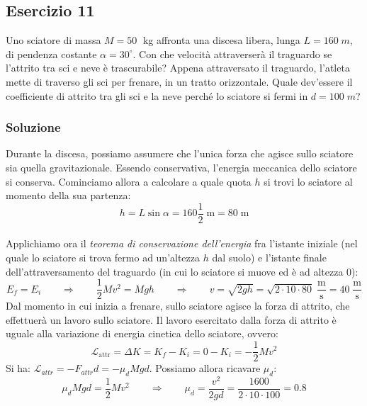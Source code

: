\documentclass[12pt,a4paper]{book}
\begin{document}
\subsection*{Esercizio 11}
Uno sciatore di massa $M=50 \;$ kg affronta una discesa libera, lunga $L=160 \; m$, di pendenza costante $\alpha=30^{\circ}$. Con che velocità attraverserà il traguardo se l'attrito tra sci e neve è trascurabile? Appena attraversato il traguardo, l'atleta mette di traverso gli sci per frenare, in un tratto orizzontale. Quale dev'essere il coefficiente di attrito tra gli sci e la neve perché lo sciatore si fermi in $d=100 \; m$? 

\subsubsection*{Soluzione}
Durante la discesa, possiamo assumere che l'unica forza che agisce sullo sciatore sia quella gravitazionale. Essendo conservativa, l'energia meccanica dello sciatore si conserva. Cominciamo allora a calcolare a quale quota $h$ si trovi lo sciatore al momento della sua partenza:\\
\begin{equation*}
h=L \sin\alpha = 160 \frac{1}{2} \; \text{m} = 80 \; \text{m}
\end{equation*}\\

Applichiamo ora il \textit{teorema di conservazione dell'energia} fra l'istante iniziale (nel quale lo sciatore si trova fermo ad un'altezza $h$ dal suolo) e l'istante finale dell'attraversamento del traguardo (in cui lo sciatore si muove ed è ad altezza $0$):
\begin{equation*}
E_{f}=E_{i} \qquad  \Rightarrow \qquad   \frac{1}{2} M v^2 = Mgh \qquad \Rightarrow \qquad v= \sqrt{2gh} = \sqrt{2\cdot 10 \cdot 80} \; \frac{\text{m}}{\text{s}} = 40 \;\frac{\text{m}}{\text{s}} 
\end{equation*}
Dal momento in cui inizia a frenare, sullo sciatore agisce la forza di attrito, che effettuerà un lavoro sullo sciatore. 
Il lavoro esercitato dalla forza di attrito è uguale alla variazione di energia cinetica dello sciatore, ovvero:
\begin{equation*}
\mathcal{L}
_{\text{attr}}= \Delta K = K_{f}-K_{i} = 0-K_{i} = -\frac{1}{2}Mv^2
\end{equation*}
Si ha: $\mathcal{L}
_{attr} = -F_{attr} d = -\mu_d M g d$. Possiamo allora ricavare $\mu_d$:\\
\begin{equation*}
\mu_d M g d = \frac{1}{2}M v^2 \qquad \Longrightarrow  \qquad \mu_d = \frac{v^2}{2 g d} = \frac{1600}{2\cdot 10 \cdot 100} = 0.8
\end{equation*}\\
\end{document}
